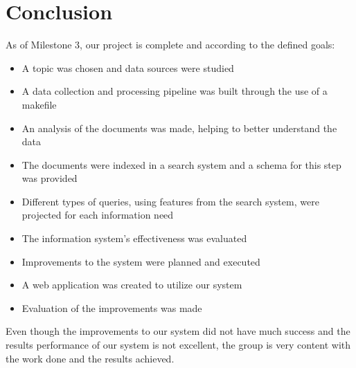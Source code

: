 \section{Conclusion}
\label{sec:Conclusion}

As of Milestone 3, our project is complete and according to the defined goals:

\begin{itemize}
    \item A topic was chosen and data sources were studied
    \item A data collection and processing pipeline was built through the use of a makefile
    \item An analysis of the documents was made, helping to better understand the data
    \item The documents were indexed in a search system and a schema for this step was provided
    \item Different types of queries, using features from the search system, were projected for each information need
    \item The information system's effectiveness was evaluated
    \item Improvements to the system were planned and executed
    \item A web application was created to utilize our system
    \item Evaluation of the improvements was made
\end{itemize}

Even though the improvements to our system did not have much success and the results performance of our system is not excellent, the group is very content with the work done and the results achieved.